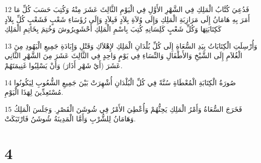 \par 12 فَدُعِيَ كُتَّابُ الْمَلِكِ فِي الشَّهْرِ الأَوَّلِ فِي الْيَوْمِ الثَّالِثَ عَشَرَ مِنْهُ وَكُتِبَ حَسَبَ كُلِّ مَا أَمَرَ بِهِ هَامَانُ إِلَى مَرَازِبَةِ الْمَلِكِ وَإِلَى وُلاَةِ بِلاَدٍ فَبِلاَدٍ وَإِلَى رُؤَسَاءِ شَعْبٍ فَشَعْبٍ كُلِّ بِلاَدٍ كَكِتَابَتِهَا وَكُلِّ شَعْبٍ كَلِسَانِهِ كُتِبَ بِاسْمِ الْمَلِكِ أَحْشَوِيرُوشَ وَخُتِمَ بِخَاتِمِ الْمَلِكِ
\par 13 وَأُرْسِلَتِ الْكِتَابَاتُ بِيَدِ السُّعَاةِ إِلَى كُلِّ بُلْدَانِ الْمَلِكِ لإِهْلاَكِ وَقَتْلِ وَإِبَادَةِ جَمِيعِ الْيَهُودِ مِنَ الْغُلاَمِ إِلَى الشَّيْخِ وَالأَطْفَالِ وَالنِّسَاءِ فِي يَوْمٍ وَاحِدٍ فِي الثَّالِثَ عَشَرَ مِنَ الشَّهْرِ الثَّانِي عَشَرَ (أَيْ شَهْرِ أَذَارَ) وَأَنْ يَسْلِبُوا غَنِيمَتَهُمْ.
\par 14 صُورَةُ الْكِتَابَةِ الْمُعْطَاةِ سُنَّةً فِي كُلِّ الْبُلْدَانِ أُشْهِرَتْ بَيْنَ جَمِيعِ الشُّعُوبِ لِيَكُونُوا مُسْتَعِدِّينَ لِهَذَا الْيَوْمِ.
\par 15 فَخَرَجَ السُّعَاةُ وَأَمْرُ الْمَلِكِ يَحِثُّهُمْ وَأُعْطِيَ الأَمْرُ فِي شُوشَنَ الْقَصْرِ. وَجَلَسَ الْمَلِكُ وَهَامَانُ لِلشُّرْبِ وَأَمَّا الْمَدِينَةُ شُوشَنُ فَارْتَبَكَتْ.

\chapter{4}

